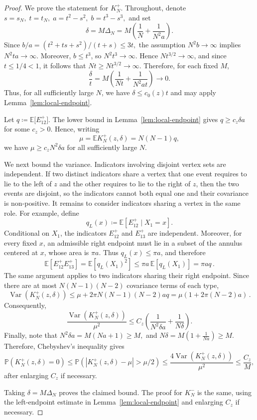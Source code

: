 \documentclass[ECP,preprint]{ejpecp} %
\newcommand{\1}{\mathbf 1}
\newcommand{\PP}{\mathbb P}
\newcommand{\EE}{\mathbb E}
\newcommand{\Var}{\operatorname{Var}}
\begin{document}
\begin{proof}
We prove the statement for \(K_N^+\). Throughout, denote
\(
    s=s_N, \; 
    t=t_N, \;
    a=t^2-s^2, \;
    b=t^3-s^3,
\)
and set
\[
    \delta=M\Delta_N
    =
    M\left(
        \frac1N+\frac{1}{N^2a}
    \right).
\]
Since
\(
    b/a
    =
    {(t^2+ts+s^2)}/{(t+s)}
    \le 3t,
\)
the assumption \(N^2b\to\infty\) implies \(N^2ta\to\infty\).
Moreover, \(b\le t^3\), so \(N^2t^3\to\infty\). Hence
\(Nt^{3/2}\to\infty\), and since \(t\le1/4<1\), it follows that
\(Nt\ge Nt^{3/2}\to\infty\).
%
%
Therefore, for each fixed \(M\),
\[
    \frac{\delta}{t}
    =
    M\left(
        \frac{1}{Nt}
        +
        \frac{1}{N^2at}
    \right)
    \longrightarrow0.
\]
Thus, for all sufficiently large \(N\), we have
\(\delta\le c_0(z)t\) and may apply
Lemma~\ref{lem:local-endpoint}.

Let
\(
    q \coloneqq \EE \big[ E^+_{12} \big] .
\)
The lower bound in Lemma~\ref{lem:local-endpoint} gives
\(
    q\ge c_z\delta a
\)
for some \(c_z>0\). Hence, writing
\[
    \mu=\EE K_N^+(z,\delta)=N(N-1)q,
\]
we have
\(
    \mu\ge c_zN^2\delta a
\)
for all sufficiently large \(N\).

We next bound the variance. Indicators involving disjoint vertex sets are independent. 
If two distinct indicators share a vertex that one event requires to
lie to the left of \(z\) and the other requires to lie to the right of
\(z\), then the two events are disjoint, so the indicators cannot both equal one and their covariance is non-positive.
%
It remains to consider indicators sharing a vertex in the same role. For example, define
\[
    q_L(x) \coloneqq \EE\left[E^+_{12}\mid X_1=x\right].
\]
Conditional on \(X_1\), the indicators \(E^+_{12}\) and \(E^+_{13}\) are independent. Moreover, for every fixed \(x\), an admissible right endpoint must lie in a subset of the annulus centered at \(x\), whose area is \(\pi a\). Thus \(q_L(x)\le\pi a\), and therefore
\[
    \EE\left[E^+_{12}E^+_{13}\right]
    =
    \EE\left[q_L(X_1)^2\right] 
    \le
    \pi a\,\EE \left[ q_L(X_1) \right]
    =
    \pi a q \, .
\]
The same argument applies to two indicators sharing their right endpoint. Since there are at most \(N(N-1)(N-2)\) covariance terms of each type,
\[
    \Var\left(K_N^+(z,\delta)\right)
    \le
    \mu+2\pi N(N-1)(N-2)aq 
    =
    \mu\left(1+2\pi(N-2)a\right) \, .
\]
Consequently,
\[
    \frac{\Var(K_N^+(z,\delta))}{\mu^2}
    \le
    C_z\left(
        \frac{1}{N^2\delta a}
        +
        \frac{1}{N\delta}
    \right).
\]
Finally, note that
\(
    N^2\delta a=M(Na+1)\ge M,
\)
and
\(
    N\delta
    =
    M\left(1+\frac{1}{Na}\right)
    \ge M.
\)
Therefore, Chebyshev's inequality gives
\[
    \PP\left(K_N^+(z,\delta)=0\right)
    \le
    {
    \PP\left( |K_N^+(z,\delta)-\mu|>\mu/2 \right) 
    }
    \le 
    \frac{4\Var(K_N^+(z,\delta))}{\mu^2}
    \le
    \frac{C_z}{M},
\]
after enlarging \(C_z\) if necessary.


%
Taking
\(\delta=M\Delta_N\) proves the claimed bound. The proof for \(K_N^-\)
is the same, using the left-endpoint estimate in
Lemma~\ref{lem:local-endpoint} and enlarging \(C_z\) if necessary.
\end{proof}
\end{document}
